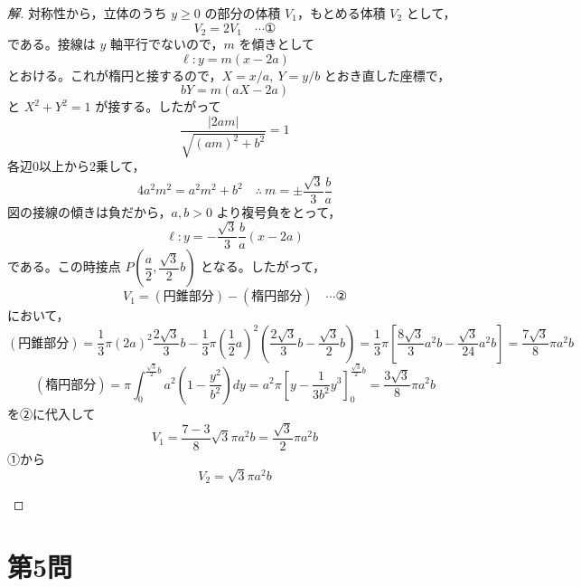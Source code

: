 \documentclass[../main.tex]{subfiles}
\begin{document}
\begin{proof}[解]
  対称性から，立体のうち $y\ge0$ の部分の体積 $V_1$，もとめる体積 $V_2$ として，
  \[
    V_2=2V_1 \quad \cdots \text{①}
  \]
  である。接線は $y$ 軸平行でないので，$m$ を傾きとして
  \[
    \ell: y=m(x-2a)
  \]
  とおける。これが楕円と接するので，$X=x/a,\ Y=y/b$ とおき直した座標で，
  \[
    bY=m(aX-2a)
  \]
  と $X^2+Y^2=1$ が接する。したがって
  \[
    \frac{|2am|}{\sqrt{(am)^2+b^2}}=1
  \]
  各辺0以上から2乗して，
  \[
    4a^2m^2=a^2m^2+b^2 \quad\therefore\ m=\pm\frac{\sqrt3}{3}\frac{b}{a}
  \]
  図の接線の傾きは負だから，$a,b>0$ より複号負をとって，
  \[
    \ell: y=-\frac{\sqrt3}{3}\frac{b}{a}(x-2a)
  \]
  である。この時接点 $P\left(\dfrac{a}{2},\dfrac{\sqrt3}{2}b\right)$ となる。したがって，
  \[
    V_1 = (\text{円錐部分}) - (\text{楕円部分}) \quad \cdots \text{②}
  \]
  において，
  \[
    (\text{円錐部分}) = \frac{1}{3}\pi(2a)^2\frac{2\sqrt3}{3}b-\frac{1}{3}\pi\left(\frac{1}{2}a\right)^2\left(\frac{2\sqrt3}{3}b-\frac{\sqrt3}{2}b\right)
    = \frac{1}{3}\pi\left[\frac{8\sqrt3}{3}a^2b-\frac{\sqrt3}{24}a^2b\right] = \frac{7\sqrt3}{8}\pi a^2b
  \]
  \[
    (\text{楕円部分}) = \pi\int_0^{\frac{\sqrt3}{2}b}a^2\left(1-\frac{y^2}{b^2}\right)dy=a^2\pi\left[y-\frac{1}{3b^2}y^3\right]_0^{\frac{\sqrt3}{2}b}=\frac{3\sqrt3}{8}\pi a^2b
  \]
  を②に代入して
  \[
    V_1=\frac{7-3}{8}\sqrt3\pi a^2b=\frac{\sqrt3}{2}\pi a^2b
  \]
  ①から
  \[
    V_2=\sqrt3\pi a^2b
  \]

  \begin{center}
  \end{center}
\end{proof}

\newpage

\section*{第5問}
\end{document}
